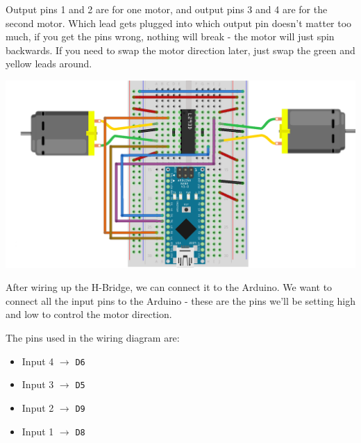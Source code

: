 \documentclass[../TinyBot.tex]{subfiles}
\begin{document}
Output pins 1 and 2 are for one motor, and output pins 3 and 4 are for the second motor. Which lead gets plugged into which output pin doesn't matter too much, if you get the pins wrong, nothing will break - the motor will just spin backwards. If you need to swap the motor direction later, just swap the green and yellow leads around. 

\bigskip





\begin{center}
    \includegraphics[width=\textwidth]{resources/H-bridge-nano-without-battery_bb.png}
    \label{fig:schematic-hbridge-nobattery}
\end{center}


After wiring up the H-Bridge, we can connect it to the Arduino. We want to connect all the input pins to the Arduino - these are the pins we'll be setting high and low to control the motor direction. 

The pins used in the wiring diagram are:
\begin{itemize}
    \item Input 4 $\rightarrow$ \lstinline[]!D6!
    \item Input 3 $\rightarrow$ \lstinline[]!D5!
    \item Input 2 $\rightarrow$ \lstinline[]!D9!
    \item Input 1 $\rightarrow$ \lstinline[]!D8!
\end{itemize}
\end{document}
